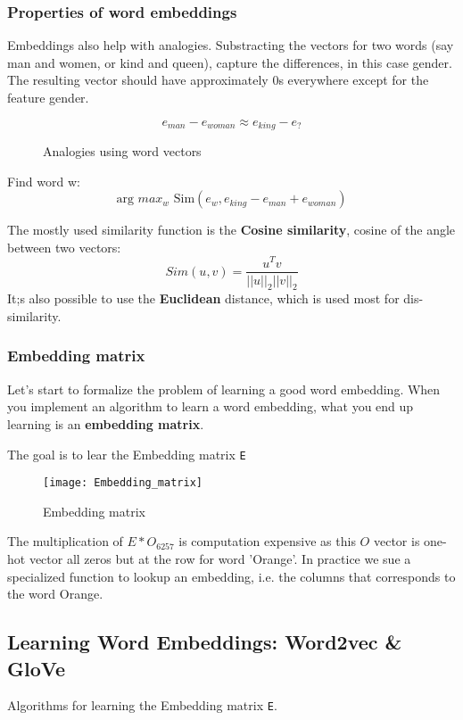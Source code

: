 \subsubsection{Properties of word embeddings}
Embeddings also help with analogies. Substracting the vectors for two words (say man and women, or kind and queen), capture the differences, in this case gender. The resulting vector should have approximately 0s everywhere except for the feature gender.

\begin{figure}[H]
\centering
\begin{equation*}
    e_{man} - e_{woman} \approx e_{king} - e_{?}
\end{equation*}
\caption{Analogies using word vectors}
\end{figure}

Find word w: 
\begin{equation}
  \text{arg } max_{w} \text{ Sim}(e_w, e_{king} - e_{man} + e_{woman})
\end{equation}

The mostly used similarity function is the \textbf{Cosine similarity}, cosine of the angle between two vectors:
\begin{equation}
  Sim(u, v) = \frac{u^T v}{\left|\left| u \right|\right|_2 \left|\left|v\right|\right|_2}
\end{equation}
It;s also possible to use the \textbf{Euclidean} distance, which is used most for dis-similarity.

\subsubsection{Embedding matrix}
Let's start to formalize the problem of learning a good word embedding. When you implement an algorithm to learn a word embedding, what you end up learning is an \textbf{embedding matrix}.

The goal is to lear the Embedding matrix \texttt{E}


\begin{figure}[H]
\centering
\texttt{[image: Embedding\_matrix]}
\caption{Embedding matrix}
\end{figure}
The multiplication of $E * O_{6257}$ is computation expensive as this $O$ vector is one-hot vector all zeros but at the row for word 'Orange'. In practice we sue a specialized function to lookup an embedding, i.e. the columns that corresponds to the word Orange.

\subsection{Learning Word Embeddings: Word2vec \& GloVe}
Algorithms for learning the Embedding matrix \texttt{E}. 


